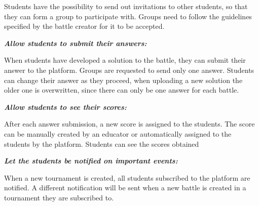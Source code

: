 \documentclass{article}
\begin{document}
\begin{description}
\begin{description}
\begin{description}
                                \begin{description}
                                    \item Students have the possibility to send out invitations to other students, so that they can form a group to participate with. Groups need to follow the guidelines specified by the battle creator for it to be accepted.
                                \end{description}
                            \item[G6.2:] \textit{\textbf{Allow students to submit their answers:}}
                                \begin{description}
                                    \item When students have developed a solution to the battle, they can submit their answer to the platform. Groups are requested to send only one answer. Students can change their answer as they proceed, when uploading a new solution the older one is overwritten, since there can only be one answer for each battle. 
                                \end{description}
                            \item[G6.3:] \textit{\textbf{Allow students to see their scores:}}
                                \begin{description}
                                    \item After each answer submission, a new score is assigned to the students. The score can be manually created by an educator or automatically assigned to the students by the platform. Students can see the scores obtained
                                \end{description}
                        \end{description}
                    \end{description}
                \item[G7:] \textit{\textbf{Let the students be notified on important events:}}
                    \begin{description}
                        \item When a new tournament is created, all students subscribed to the platform are notified. A different notification will be sent when a new battle is created in a tournament they are subscribed to.
                    \end{description}
            \end{description}
\end{document}

